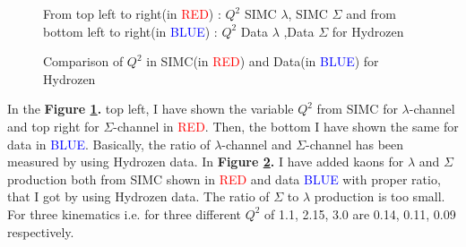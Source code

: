 \documentclass[aps,11pt]{revtex4}
\begin{document}
\begin{figure}[h]
	\centering
	\label{fig:Q2_1}
	\caption{From top left to right(in \textcolor{red}{RED}) : $Q^2$ SIMC $\lambda$, SIMC $\Sigma$ and from bottom left to right(in \textcolor{blue}{BLUE}) : $Q^2$ Data $\lambda$  ,Data $\Sigma$ for Hydrozen}
\end{figure}
\begin{figure}[h]
	\centering
	\caption{Comparison of $Q^2$ in SIMC(in \textcolor{red}{RED}) and Data(in \textcolor{blue}{BLUE}) for Hydrozen}
	\label{fig:Q2_2}
\end{figure}
\noindent
In the \textbf{Figure \ref{fig:Q2_1}.} top left, I have shown the variable $Q^2$ from SIMC for $\lambda$-channel and top right for $\Sigma$-channel in \textcolor{red}{RED}. Then, the bottom I have shown the same for data in \textcolor{blue}{BLUE}. Basically, the ratio of $\lambda$-channel and $\Sigma$-channel has been measured by using Hydrozen data. In \textbf{Figure \ref{fig:Q2_2}.} I have added kaons for $\lambda$ and $\Sigma$ production both from SIMC shown in \textcolor{red}{RED} and data \textcolor{blue}{BLUE} with proper ratio, that I got by using Hydrozen data. The ratio of $\Sigma$ to $\lambda$ production is too small. For three kinematics i.e. for three different $Q^2$ of 1.1, 2.15, 3.0 are 0.14, 0.11, 0.09 respectively.
\end{document}
